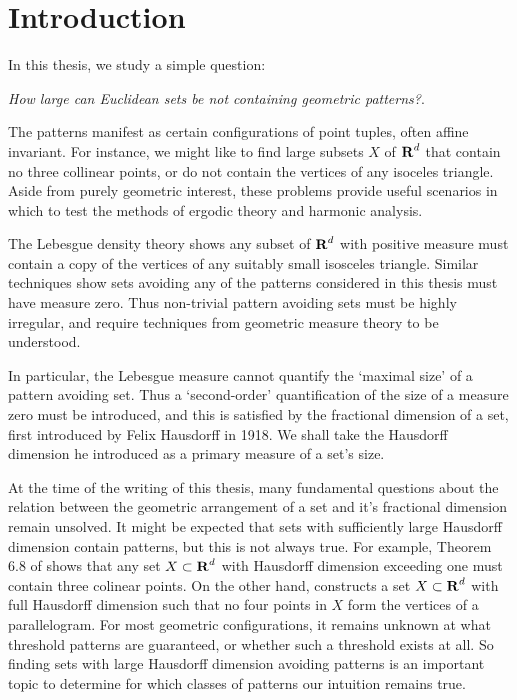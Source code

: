 
\chapter{Introduction}
\label{ch:Introduction}

In this thesis, we study a simple question:
%
\begin{center}
	{\it How large can Euclidean sets be not containing geometric patterns?}.
\end{center}
%
The patterns manifest as certain configurations of point tuples, often affine invariant. For instance, we might like to find large subsets $X$ of $\operatorname{\mathbf{R}}^d$ that contain no three collinear points, or do not contain the vertices of any isoceles triangle. Aside from purely geometric interest, these problems provide useful scenarios in which to test the methods of ergodic theory and harmonic analysis.

The Lebesgue density theory shows any subset of $\operatorname{\mathbf{R}}^d$ with positive measure must contain a copy of the vertices of any suitably small isosceles triangle. Similar techniques show sets avoiding any of the patterns considered in this thesis must have measure zero. Thus non-trivial pattern avoiding sets must be highly irregular, and require techniques from geometric measure theory to be understood.

In particular, the Lebesgue measure cannot quantify the `maximal size' of a pattern avoiding set. Thus a `second-order' quantification of the size of a measure zero must be introduced, and this is satisfied by the fractional dimension of a set, first introduced by Felix Hausdorff in 1918. We shall take the Hausdorff dimension he introduced as a primary measure of a set's size.%

At the time of the writing of this thesis, many fundamental questions about the relation between the geometric arrangement of a set and it's fractional dimension remain unsolved. It might be expected that sets with sufficiently large Hausdorff dimension contain patterns, but this is not always true. For example, Theorem 6.8 of \cite{Matilla} shows that any set $X \subset \operatorname{\mathbf{R}}^d$ with Hausdorff dimension exceeding one must contain three colinear points. On the other hand, \cite{Maga} constructs a set $X \subset \operatorname{\mathbf{R}}^d$ with full Hausdorff dimension such that no four points in $X$ form the vertices of a parallelogram. For most geometric configurations, it remains unknown at what threshold patterns are guaranteed, or whether such a threshold exists at all. So finding sets with large Hausdorff dimension avoiding patterns is an important topic to determine for which classes of patterns our intuition remains true.

